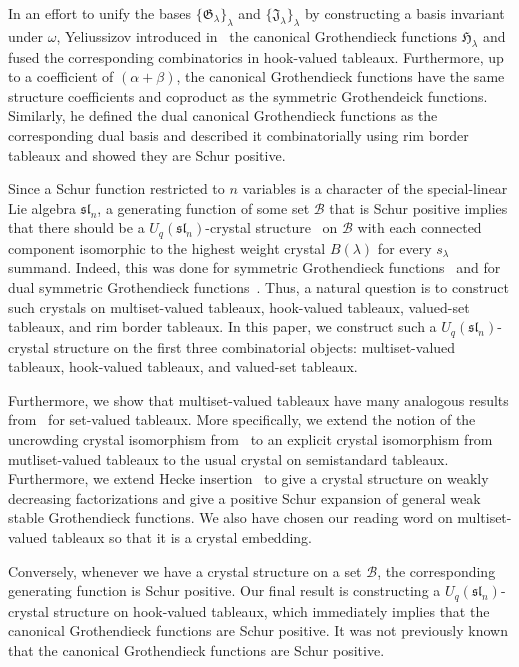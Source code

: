 \documentclass[ALCO,ThmDefs,Unicode,epreuves]{cedram}
\renewcommand{\G}{\mathfrak{G}}  %
\newcommand{\wG}{\mathfrak{J}}  %
\newcommand{\hG}{\mathfrak{H}}  %
\newcommand{\fsl}{\mathfrak{sl}}
\begin{document}
In an effort to unify the bases $\{\G_{\lambda}\}_{\lambda}$ and $\{\wG_{\lambda}\}_{\lambda}$ by constructing a basis invariant under $\omega$, Yeliussizov introduced in~\cite{Yel17} the canonical Grothendieck functions $\hG_{\lambda}$ and fused the corresponding combinatorics in hook-valued tableaux. Furthermore, up to a coefficient of $(\alpha + \beta)$, the canonical Grothendieck functions have the same structure coefficients and coproduct as the symmetric Grothendeick functions. Similarly, he defined the dual canonical Grothendieck functions as the corresponding dual basis and described it combinatorially using rim border tableaux and showed they are Schur positive.

Since a Schur function restricted to $n$ variables is a character of the special-linear Lie algebra $\fsl_n$, a generating function of some set $\mathcal{B}$ that is Schur positive implies that there should be a $U_q(\fsl_n)$-crystal structure~\cite{K90,K91} on $\mathcal{B}$ with each connected component isomorphic to the highest weight crystal $B(\lambda)$ for every $s_{\lambda}$ summand.
Indeed, this was done for symmetric Grothendieck functions~\cite{MPS18} and for dual symmetric Grothendieck functions~\cite{Galashin17}.
Thus, a natural question is to construct such crystals on multiset-valued tableaux, hook-valued tableaux, valued-set tableaux, and rim border tableaux.
In this paper, we construct such a $U_q(\fsl_n)$-crystal structure on the first three combinatorial objects: multiset-valued tableaux, hook-valued tableaux, and valued-set tableaux.

Furthermore, we show that multiset-valued tableaux have many analogous results from~\cite{MPS18} for set-valued tableaux. More specifically, we extend the notion of the uncrowding crystal isomorphism from~\cite[Sec.~6]{Buch02} to an explicit crystal isomorphism from mutliset-valued tableaux to the usual crystal on semistandard tableaux. Furthermore, we extend Hecke insertion~\cite{BKSTY08} to give a crystal structure on weakly decreasing factorizations and give a positive Schur expansion of general weak stable Grothendieck functions. We also have chosen our reading word on multiset-valued tableaux so that it is a crystal embedding.

Conversely, whenever we have a crystal structure on a set $\mathcal{B}$, the corresponding generating function is Schur positive. Our final result is constructing a $U_q(\fsl_n)$-crystal structure on hook-valued tableaux, which immediately implies that the canonical Grothendieck functions are Schur positive. It was not previously known that the canonical Grothendieck functions are Schur positive.
\end{document}
